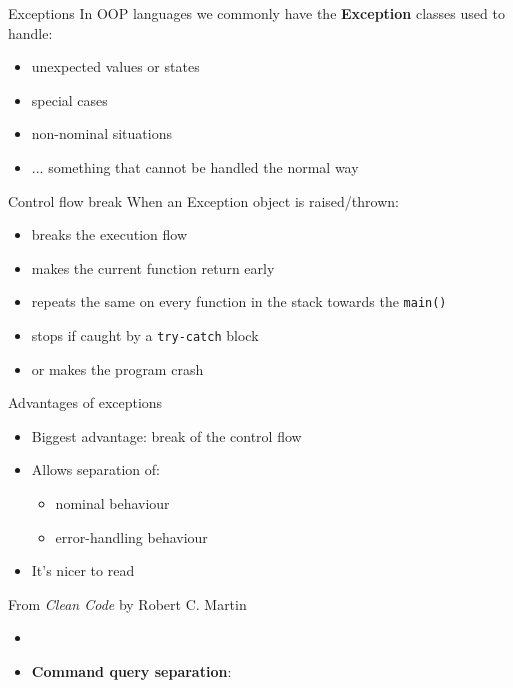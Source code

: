 \documentclass[aspectratio=169,14pt]{beamer}
\begin{document}
\begin{frame}{Exceptions}
In OOP languages we commonly have the \textbf{Exception} classes used to handle:
\begin{itemize}
    \item unexpected values or states
    \item special cases
    \item non-nominal situations
    \item ... something that cannot be handled the normal way
\end{itemize}
\end{frame}



\begin{frame}{Control flow break}
When an Exception object is raised/thrown:
\begin{itemize}
    \item breaks the execution flow
    \item makes the current function return early
    \item repeats the same on every function in the stack towards the \texttt{main()}
    \item stops if caught by a \texttt{try-catch} block
    \item or makes the program crash
\end{itemize}
\end{frame}



\begin{frame}{Advantages of exceptions}
\begin{itemize}
    \item Biggest advantage: break of the control flow
    \item Allows separation of:\\
    \begin{itemize}
        \item nominal behaviour
        \item error-handling behaviour
    \end{itemize}
    \item It's nicer to read
\end{itemize}
\end{frame}



\begin{frame}{From \textit{Clean Code} by Robert C. Martin}
\begin{itemize}
    \item \textit{}
    \item \textbf{Command query separation}: \textit{}
\end{itemize}
\end{frame}
\end{document}

